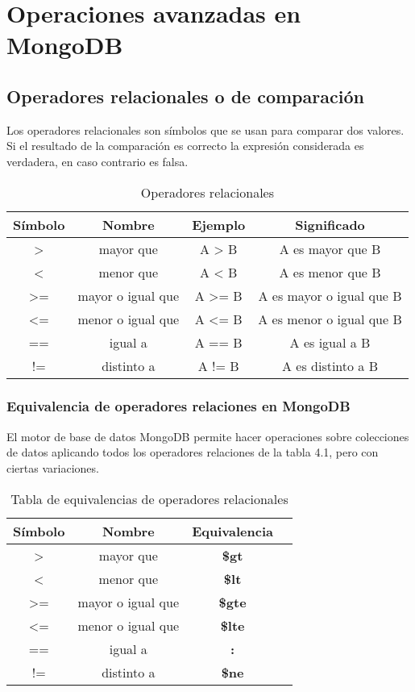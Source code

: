 \chapter{Operaciones avanzadas en MongoDB}

\section{Operadores relacionales o de comparación}

Los operadores relacionales son símbolos que se usan para comparar dos valores. Si el resultado de la comparación es correcto la expresión considerada es verdadera, en caso contrario es falsa.

\begin{table}[ht] 
\caption{Operadores relacionales}
\centering
\begin{tabular}{c c c c}
\hline\hline
Símbolo & Nombre & Ejemplo & Significado \\ [0.5ex] 
\hline
> & mayor que & A > B & A es mayor que B \\ 
< & menor que & A < B & A es menor que B \\
>= & mayor o igual que & A >= B & A es mayor o igual que B \\
<= & menor o igual que & A <= B & A es menor o igual que B \\ 
== & igual a & A == B & A es igual a B \\ 
!= & distinto a & A != B & A es distinto a B \\ [1ex]
\hline
\end{tabular} 
\label{table:nonlin} 
\end{table}

\subsection{Equivalencia de operadores relaciones en MongoDB}

El motor de base de datos MongoDB permite hacer operaciones sobre colecciones de datos aplicando todos los operadores relaciones de la tabla 4.1, pero con ciertas variaciones.

\begin{table}[ht] 
\caption{Tabla de equivalencias de operadores relacionales}
\centering
\begin{tabular}{c c c c}
\hline\hline
Símbolo & Nombre & Equivalencia \\ [0.5ex] 
\hline
> & mayor que & \bf{\$gt} \\ 
< & menor que & \bf{\$lt} \\
>= & mayor o igual que & \bf{\$gte} \\
<= & menor o igual que & \bf{\$lte} \\
== & igual a & \bf{:} \\ 
!= & distinto a & \bf{\$ne} \\ [1ex]
\hline
\end{tabular} 
\label{table:nonlin} 
\end{table}

